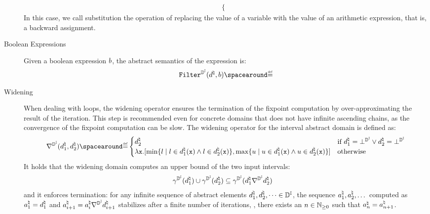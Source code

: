 \begin{description}
\begin{align*}
\begin{cases}
    \end{cases}
  \end{align*}
  In this case, we call substitution the operation of replacing the value of a variable with the value of an arithmetic expression, that is, a backward assignment.
  \item[Boolean Expressions]
  Given a boolean expression $b$, the abstract semantics of the expression is:
  \begin{align*}
    \intervalabstractdomainfilter(\defabstractvalue, \defbexp) \DefeQ
  \end{align*}
  \item[Widening]
  When dealing with loops, the widening operator ensures the termination of the fixpoint computation by over-approximating the result of the iteration.
  This step is recommended even for concrete domains that does not have infinite ascending chains, as the convergence of the fixpoint computation can be slow.
  The widening operator for the interval abstract domain is defined as:
  \begin{align*}
    \intervalabstractdomainwidening(\defabstractvalue_1, \defabstractvalue_2) \DefeQ \begin{cases}
      \defabstractvalue_2 & \text{if } \defabstractvalue_1 = \intervalabstractdomainbottom \lor \defabstractvalue_2 = \intervalabstractdomainbottom \\
      \lambda \defvariable.\interval{\min\setdef{l}{l\in\defabstractvalue_1(\defvariable) \land l\in\defabstractvalue_2(\defvariable)}}{\max\setdef{u}{u\in\defabstractvalue_1(\defvariable) \land u\in\defabstractvalue_2(\defvariable)}} & \text{otherwise}
    \end{cases}
  \end{align*}
  It holds that the widening domain computes an upper bound of the two input intervals:
  \begin{align*}
    \gamma^{\mathbb{D}^{\mathbb{I}}}(d^\natural_1) \cup \gamma^{\mathbb{D}^{\mathbb{I}}}(d^\natural_2) &\subseteq \gamma^{\mathbb{D}^{\mathbb{I}}}(d^\natural_1 \nabla^{\mathbb{D}^{\mathbb{I}}} d^\natural_2)
  \end{align*}
  and it enforces termination: for any infinite sequence of abstract elements $d^\natural_1, d^\natural_2, \dots \in \mathbb{D}^{\mathbb{I}}$, the sequence $a^\natural_1, a^\natural_2, \dots$ computed as $a^\natural_1 = d^\natural_1$ and $a^\natural_{i+1} = a^\natural_i \nabla^{\mathbb{D}^{\mathbb{I}}} d^\natural_{i+1}$ stabilizes after a finite number of iterations, \ie, there exists an $n \in \mathbb{N}_{\ge0}$ such that $a^\natural_n = a^\natural_{n+1}$.

\end{description}
